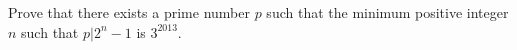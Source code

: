 Prove that there exists a prime number $p$ such that the minimum positive integer $n$ such that $p|2^n -1$ is $3^{2013}$.